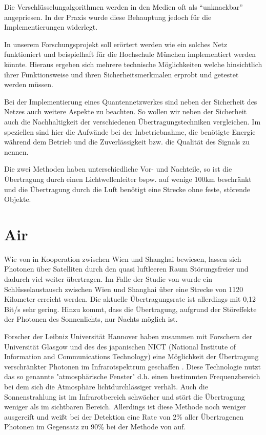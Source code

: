 Die Verschlüsselungalgorithmen werden in den Medien oft als “unknackbar” 
angepriesen. In der Praxis wurde diese Behauptung jedoch für die Implementierungen widerlegt.

In unserem Forschungsprojekt soll erörtert werden wie ein solches Netz funktioniert und beispielhaft für die Hochschule München implementiert werden könnte.
Hieraus ergeben sich mehrere technische Möglichkeiten welche hinsichtlich ihrer Funktionsweise und ihren Sicherheitsmerkmalen erprobt und getestet werden müssen.

Bei der Implementierung eines Quantennetzwerkes sind neben der Sicherheit des Netzes auch weitere Aspekte zu beachten.
So wollen wir neben der Sicherheit auch die Nachhaltigkeit der verschiedenen Übertragungstechniken vergleichen.
Im speziellen sind hier die Aufwände bei der Inbetriebnahme, die benötigte Energie während dem Betrieb und die Zuverlässigkeit bzw. die Qualität des Signals zu nennen.

Die zwei Methoden haben unterschiedliche Vor- und Nachteile, so ist die Übertragung durch einen Lichtwellenleiter bspw. auf wenige 100km beschränkt und die Übertragung durch die Luft benötigt eine Strecke ohne feste, störende Objekte.


\section{Air}

Wie von \cite{Ren_2017} in Kooperation zwischen Wien und Shanghai bewiesen, lassen sich Photonen über Satelliten durch den quasi luftleeren Raum Störungsfreier und dadurch viel weiter übertragen. Im Falle der Studie von \cite{Ren_2017} wurde ein Schlüsselaustausch zwischen Wien und Shanghai über eine Strecke von 1120 Kilometer erreicht werden. Die aktuelle Übertragungsrate ist allerdings mit 0,12 Bit/s sehr gering. Hinzu kommt, dass die Übertragung, aufgrund der Störeffekte der Photonen des Sonnenlichts, nur Nachts möglich ist.

Forscher der Leibniz Universität Hannover haben zusammen mit Forschern der Universität Glasgow und des des japanischen NICT (National Institute of Information and Communications Technology) eine Möglichkeit der Übertragung verschränkter Photonen im Infrarotspektrum geschaffen \cite{prabhakar_two-photon_2020}. Diese Technologie nutzt das so genannte "atmosphärische Fenster" d.h. einen bestimmten Frequenzbereich bei dem sich die Atmosphäre lichtdurchlässiger verhält. Auch die Sonnenstrahlung ist im Infrarotbereich schwächer und stört die Übertragung weniger als im sichtbaren Bereich. Allerdings ist diese Methode noch weniger ausgereift und weißt bei der Detektion eine Rate von 2\% aller Übertragenen Photonen im Gegensatz zu 90\% bei der Methode von \cite{Ren_2017} auf.

